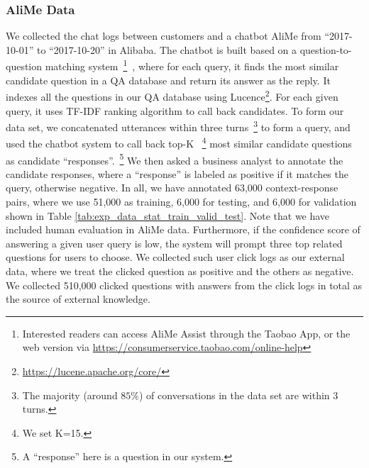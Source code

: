 \subsubsection{\textbf{AliMe Data}}
We collected the chat logs between customers and a chatbot AliMe from ``2017-10-01'' to ``2017-10-20'' in Alibaba. %
The chatbot is built based on a question-to-question matching system~\footnote{
Interested readers can access AliMe Assist through the Taobao App, or the web version via \url{https://consumerservice.taobao.com/online-help}}~\cite{alime-demo}, where for each query, it finds the most similar candidate question in a QA database and return its answer as the reply. It indexes all the questions in our QA database using Lucence\footnote{\url{https://lucene.apache.org/core/}}. For each given query, it uses TF-IDF ranking algorithm to call back candidates. %
To form our data set, we concatenated utterances within three turns~\footnote{The majority (around $85\%$) of conversations in the data set are within 3 turns.} to form a query, and used the chatbot system to call back top-K ~\footnote{We set K=15.} most similar candidate questions as candidate ``responses''.~\footnote{A ``response'' here is a question in our system.} We then asked a business analyst to annotate the candidate responses, where a ``response'' is labeled as positive if it matches the query, otherwise negative. In all, we have annotated 63,000 context-response pairs, where we use 51,000 as training, 6,000 for testing, and 6,000 for validation shown in Table \ref{tab:exp_data_stat_train_valid_test}. Note that we have included human evaluation in AliMe data. Furthermore, if the confidence score of answering a given user query is low, the system will prompt three top related questions for users to choose. We collected such user click logs as our external data, where we treat the clicked question as positive and the others as negative. We collected 510,000 clicked questions with answers from the click logs in total as the source of external knowledge. %

